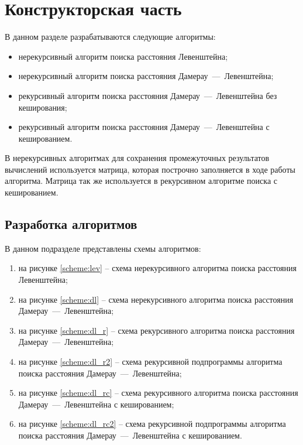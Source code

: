 \chapter{Конструкторская часть}

В данном разделе разрабатываются следующие алгоритмы:
\begin{itemize}[left=\parindent]
	\item нерекурсивный алгоритм поиска расстояния Левенштейна;
	\item нерекурсивный алгоритм поиска расстояния Дамерау~---~Левенштейна;
	\item рекурсивный алгоритм поиска расстояния Дамерау~---~Левенштейна без кеширования;
	\item  рекурсивный алгоритм поиска расстояния Дамерау~---~Левенштейна с кешированием. 
\end{itemize}

В нерекурсивных алгоритмах для сохранения промежуточных результатов вычислений используется матрица, которая построчно заполняется в ходе работы алгоритма. Матрица так же используется в рекурсивном алгоритме поиска с кешированием. 

\section{Разработка алгоритмов}

В данном подразделе представлены схемы алгоритмов:
\begin{enumerate}[label={\arabic*)}]
	\item на рисунке \ref{scheme:lev} -- схема нерекурсивного алгоритма поиска расстояния Левенштейна;
	\item на рисунке \ref{scheme:dl} -- схема нерекурсивного алгоритма поиска расстояния Дамерау~---~Левенштейна;
	\item на рисунке \ref{scheme:dl_r} -- схема рекурсивного алгоритма поиска расстояния Дамерау~---~Левенштейна;
	\item на рисунке \ref{scheme:dl_r2} -- схема рекурсивной подпрограммы алгоритма поиска расстояния Дамерау~---~Левенштейна;
	\item на рисунке \ref{scheme:dl_rc} -- схема рекурсивного алгоритма поиска расстояния Дамерау~---~Левенштейна с кешированием;
	\item на рисунке \ref{scheme:dl_rc2} -- схема рекурсивной подпрограммы алгоритма поиска расстояния Дамерау~---~Левенштейна с кешированием.
\end{enumerate}

